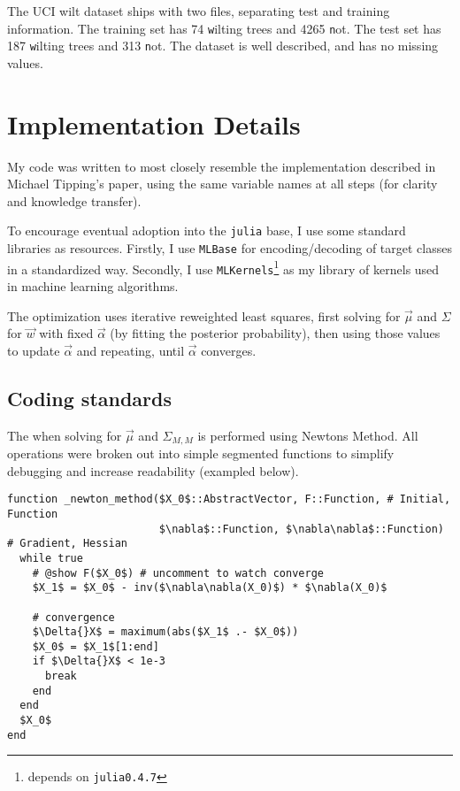 \documentclass[11pt]{article} %
\def\irls{iterative reweighted least squares}
\def\julia{\texttt{julia}\xspace}
\def\juliaV{\julia \texttt{0.4.7}\xspace}
\def\MT{Michael Tipping\xspace}
\def\wilt{UCI wilt dataset\xspace}
\begin{document}
The \wilt ships with two files, separating test and training
information. The training set has 74 \texttt{w}ilting trees and
4265 \texttt{n}ot. The test set has 187 \texttt{w}ilting trees
and 313 \texttt{n}ot. The dataset is well described, and has no
missing values.

\section{Implementation Details}
My code was written to most closely resemble the implementation
described in \MT's paper, using the same variable names at all
steps (for clarity and knowledge transfer).

To encourage eventual adoption into the \julia base, I use some
standard libraries as resources. Firstly, I use \texttt{MLBase}
for encoding/decoding of target classes in a standardized way.
Secondly, I use \texttt{MLKernels}\footnote{depends on \juliaV}
as my library of kernels used in machine learning algorithms.

The optimization uses \irls, first solving for $\vec{\mu}$ and
$\Sigma$ for $\vec{w}$ with fixed $\vec{\alpha}$ (by fitting
the posterior probability), then using those values to update
$\vec{\alpha}$ and repeating, until $\vec{\alpha}$ converges.

\subsection{Coding standards}
The when solving for $\vec{\mu}$ and $\Sigma_{M,M}$ is performed
using Newtons Method. All operations were broken out into simple
segmented functions to simplify debugging and increase readability
(exampled below).

\begin{lstlisting}[mathescape=true]
function _newton_method($X_0$::AbstractVector, F::Function, # Initial, Function
                        $\nabla$::Function, $\nabla\nabla$::Function)          # Gradient, Hessian
  while true
    # @show F($X_0$) # uncomment to watch converge
    $X_1$ = $X_0$ - inv($\nabla\nabla(X_0)$) * $\nabla(X_0)$

    # convergence
    $\Delta{}X$ = maximum(abs($X_1$ .- $X_0$))
    $X_0$ = $X_1$[1:end]
    if $\Delta{}X$ < 1e-3
      break
    end
  end
  $X_0$
end
\end{lstlisting}
\end{document}
